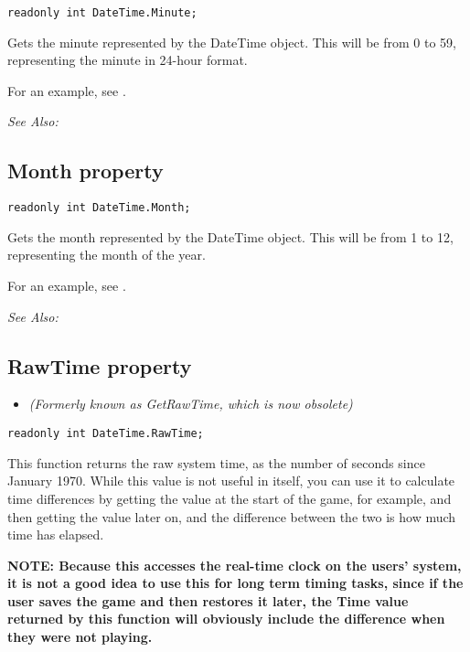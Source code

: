 \begin{verbatim}
readonly int DateTime.Minute;
\end{verbatim}
Gets the minute represented by the DateTime object. This will be from 0 to 59,
representing the minute in 24-hour format.

For an example, see .

\it{See Also:} 


\subsection{Month property}\label{DateTime.Month}%

\begin{verbatim}
readonly int DateTime.Month;
\end{verbatim}
Gets the month represented by the DateTime object. This will be from 1 to 12,
representing the month of the year.

For an example, see .

\it{See Also:} 


\subsection{RawTime property}\label{DateTime.RawTime}%

\begin{itemize}
\item \it{(Formerly known as GetRawTime, which is now obsolete)}
\end{itemize}

\begin{verbatim}
readonly int DateTime.RawTime;
\end{verbatim}
This function returns the raw system time, as the number of seconds since January 1970.
While this value is not useful in itself, you can use it to calculate time differences
by getting the value at the start of the game, for example, and then getting the value
later on, and the difference between the two is how much time has elapsed.

\bf{NOTE:} Because this accesses the real-time clock on the users' system, it is not
a good idea to use this for long term timing tasks, since if the user saves the game and
then restores it later, the Time value returned by this function will obviously include
the difference when they were not playing.

